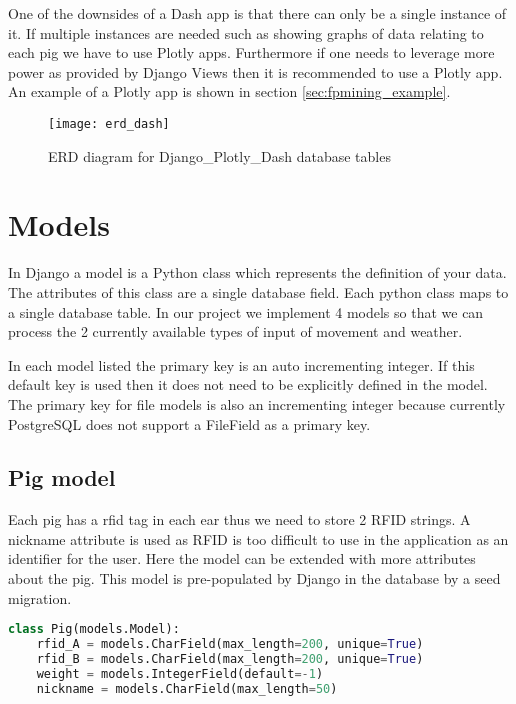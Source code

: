 One of the downsides of a Dash app is that there can only be a single instance of it. If multiple instances are needed such
as showing graphs of data relating to each pig we have to use Plotly apps.
Furthermore if one needs to leverage more power as provided by Django Views then it is recommended to use a Plotly app.
An example of a Plotly app is shown in section \ref{sec:fpmining_example}.

\begin{figure}[H]
	\centering
	\texttt{[image: erd\_dash]}
	\caption{ERD diagram for Django\_Plotly\_Dash database tables}
	\label{fig:erd_dash}
\end{figure}

\section{Models}
\label{sec:models}
In Django a model is a Python class which represents the definition of your data. 
The attributes of this class are a single database field. Each python class maps to a single database table.
In our project we implement 4 models so that we can process the 2 currently available types of input of movement and weather.

\begin{note}
	In each model listed the primary key is an auto incrementing integer. If this default key is used then it does not need to be
	explicitly defined in the model. The primary key for file models is also an incrementing integer because currently PostgreSQL does
	not support a FileField as a primary key.
\end{note}

\subsection{Pig model}
Each pig has a rfid tag in each ear thus we need to store 2 RFID strings. A nickname attribute is used as RFID is too difficult to
use in the application as an identifier for the user. Here the model can be extended with more attributes about the pig. This model
is pre-populated by Django in the database by a seed migration.

\begin{lstlisting}[language={Python}]
class Pig(models.Model):
	rfid_A = models.CharField(max_length=200, unique=True)
	rfid_B = models.CharField(max_length=200, unique=True)
	weight = models.IntegerField(default=-1)
	nickname = models.CharField(max_length=50)
\end{lstlisting}

